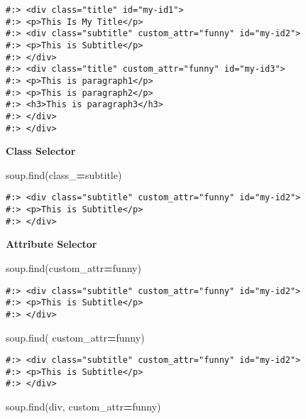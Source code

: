 \documentclass[
]{book}
\newenvironment{Shaded}{\begin{snugshade}}{\end{snugshade}}
\newcommand{\NormalTok}[1]{#1}
\newcommand{\OperatorTok}[1]{\textcolor[rgb]{0.43,0.43,0.43}{\textbf{#1}}}
\newcommand{\StringTok}[1]{\textcolor[rgb]{0.5,0.5,0.5}{#1}}
\begin{document}
\begin{verbatim}
#:> <div class="title" id="my-id1">
#:> <p>This Is My Title</p>
#:> <div class="subtitle" custom_attr="funny" id="my-id2">
#:> <p>This is Subtitle</p>
#:> </div>
#:> <div class="title" custom_attr="funny" id="my-id3">
#:> <p>This is paragraph1</p>
#:> <p>This is paragraph2</p>
#:> <h3>This is paragraph3</h3>
#:> </div>
#:> </div>
\end{verbatim}

\textbf{Class Selector}

\begin{Shaded}
\begin{Highlighting}[]
\NormalTok{soup.find(class\_}\OperatorTok{=}\StringTok{\textquotesingle{}subtitle\textquotesingle{}}\NormalTok{)}
\end{Highlighting}
\end{Shaded}

\begin{verbatim}
#:> <div class="subtitle" custom_attr="funny" id="my-id2">
#:> <p>This is Subtitle</p>
#:> </div>
\end{verbatim}

\textbf{Attribute Selector}

\begin{Shaded}
\begin{Highlighting}[]
\NormalTok{soup.find(custom\_attr}\OperatorTok{=}\StringTok{\textquotesingle{}funny\textquotesingle{}}\NormalTok{)}
\end{Highlighting}
\end{Shaded}

\begin{verbatim}
#:> <div class="subtitle" custom_attr="funny" id="my-id2">
#:> <p>This is Subtitle</p>
#:> </div>
\end{verbatim}

\begin{Shaded}
\begin{Highlighting}[]
\NormalTok{soup.find(       custom\_attr}\OperatorTok{=}\StringTok{\textquotesingle{}funny\textquotesingle{}}\NormalTok{)}
\end{Highlighting}
\end{Shaded}

\begin{verbatim}
#:> <div class="subtitle" custom_attr="funny" id="my-id2">
#:> <p>This is Subtitle</p>
#:> </div>
\end{verbatim}

\begin{Shaded}
\begin{Highlighting}[]
\NormalTok{soup.find(}\StringTok{\textquotesingle{}div\textquotesingle{}}\NormalTok{, custom\_attr}\OperatorTok{=}\StringTok{\textquotesingle{}funny\textquotesingle{}}\NormalTok{)}
\end{Highlighting}
\end{Shaded}
\end{document}
